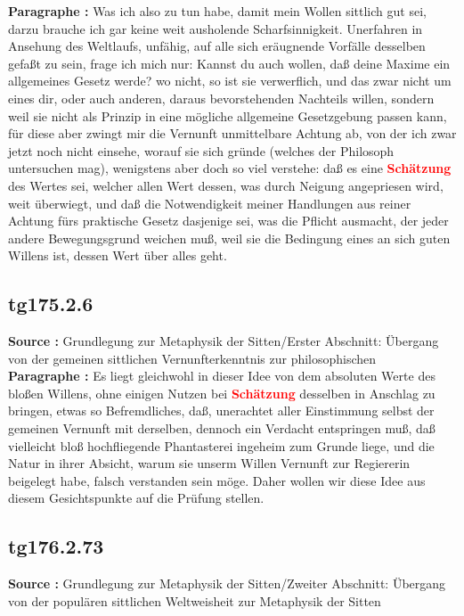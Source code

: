 \documentclass[a4paper,12pt,twoside]{book}
\newcommand{\match}[1]{\textcolor{red}{\textbf{#1}}}
\begin{document}
	\noindent\textbf{Paragraphe : }Was ich also zu tun habe, damit mein Wollen sittlich gut sei, darzu brauche ich gar keine weit ausholende Scharfsinnigkeit. Unerfahren in Ansehung des Weltlaufs, unfähig, auf alle sich eräugnende Vorfälle desselben gefaßt zu sein, frage ich mich nur: Kannst du auch wollen, daß deine Maxime ein allgemeines Gesetz werde? wo nicht, so ist sie verwerflich, und das zwar nicht um eines dir, oder auch anderen, daraus bevorstehenden Nachteils willen, sondern weil sie nicht als Prinzip in eine mögliche allgemeine Gesetzgebung passen kann, für diese aber zwingt mir die Vernunft unmittelbare Achtung ab, von der ich zwar jetzt noch nicht einsehe, worauf sie sich gründe (welches der Philosoph untersuchen mag), wenigstens aber doch so viel verstehe: daß es eine \match{Schätzung} des Wertes sei, welcher allen Wert dessen, was durch Neigung angepriesen wird, weit überwiegt, und daß die Notwendigkeit meiner Handlungen aus reiner Achtung fürs praktische Gesetz dasjenige sei, was die Pflicht ausmacht, der jeder andere Bewegungsgrund weichen muß, weil sie die Bedingung eines an sich guten Willens ist, dessen Wert über alles geht. 
	
	\subsection*{tg175.2.6} 
	\textbf{Source : }Grundlegung zur Metaphysik der Sitten/Erster Abschnitt: Übergang von der gemeinen sittlichen Vernunfterkenntnis zur philosophischen\\  
	
	\noindent\textbf{Paragraphe : }Es liegt gleichwohl in dieser Idee von dem absoluten Werte des bloßen Willens, ohne einigen Nutzen bei \match{Schätzung} desselben in Anschlag zu bringen, etwas so Befremdliches, daß, unerachtet aller Einstimmung selbst der gemeinen  Vernunft mit derselben, dennoch ein Verdacht entspringen muß, daß vielleicht bloß hochfliegende Phantasterei ingeheim zum Grunde liege, und die Natur in ihrer Absicht, warum sie unserm Willen Vernunft zur Regiererin beigelegt habe, falsch verstanden sein möge. Daher wollen wir diese Idee aus diesem Gesichtspunkte auf die Prüfung stellen. 
	
	\subsection*{tg176.2.73} 
	\textbf{Source : }Grundlegung zur Metaphysik der Sitten/Zweiter Abschnitt: Übergang von der populären sittlichen Weltweisheit zur Metaphysik der Sitten\\  
	
\end{document}
